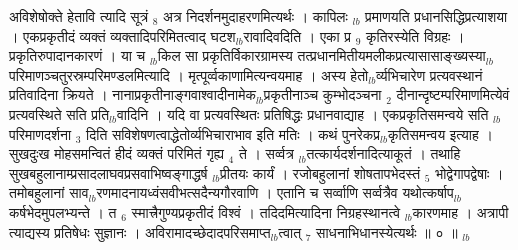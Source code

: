 \documentclass[article,12pt,a4paper]{memoir}%
\newcounter{parCount}
\begin{document}
	  
	  \pstart \leavevmode%
	\hphantom{.}{\color{DodgerBlue3}अविशेषोक्ते हेतावि} त्यादि सूत्रं {\tiny $_{8}$} अत्र निदर्शनमुदाहरणमित्यर्थः । {\color{DodgerBlue3}कापिलः} {\tiny $_{lb}$} प्रमाणयति प्रधानसिद्धिप्रत्याशया । एकप्रकृतीदं व्यक्तं व्यक्तादिपरिमितत्वाद् घटश{\tiny $_{lb}$}रावादिवदिति । एका प्र {\tiny $_{9}$} \leavevmode{} कृतिरस्येति विग्रहः । प्रकृतिरुपादानकारणं । या च {\tiny $_{lb}$}किल सा प्रकृतिर्विकारग्रामस्य तत्प्रधानमितीयमलीकप्रत्यासासाङ्ख्यस्या{\tiny $_{lb}$}\leavevmode{} परिमाणञ्चतुरस्रम्परिमण्डलमित्यादि । मृत्पूर्व्वकाणामित्यन्वयमाह । अस्य हेतो{\tiny $_{lb}$}र्व्यभिचारेण प्रत्यवस्थानं प्रतिवादिना क्रियते । नानाप्रकृतीनाङ्गवाश्वादीनामेक{\tiny $_{lb}$}प्रकृतीनाञ्च कुम्भोदञ्चना {\tiny $_{2}$} दीनान्दृष्टम्परिमाणमित्येवं प्रत्यवस्थिते सति प्रति{\tiny $_{lb}$}वादिनि । यदि वा प्रत्यवस्थितः प्रतिषिद्धः प्रधानवाद्याह । एकप्रकृतिसमन्वये सति {\tiny $_{lb}$}परिमाणदर्शना {\tiny $_{3}$} दिति सविशेषणत्वाद्धेतोर्व्यभिचाराभाव इति मतिः । कथं पुनरेकप्र{\tiny $_{lb}$}कृतिसमन्वय इत्याह । सुखदुःख {\color{DodgerBlue3}मोहसमन्वितं} हीदं व्यक्तं परिमितं गृह्य {\tiny $_{4}$} ते । सर्व्वत्र {\tiny $_{lb}$}तत्कार्यदर्शनादित्याकूतं । तथाहि सुखबहुलानाम्प्रसादलाघवप्रसवाभिष्वङ्गाद्धर्ष {\tiny $_{lb}$}प्रीतयः कार्यं । रजोबहुलानां शोषतापभेदस्तं {\tiny $_{5}$} भोद्वेगापद्वेषाः । तमोबहुलानां साव{\tiny $_{lb}$}रणमादनायध्वंसवीभत्सदैन्यगौरवाणि । एतानि च सर्व्वाणि सर्व्वत्रैव यथोत्कर्षाप{\tiny $_{lb}$}कर्षभेदमुपलभ्यन्ते । त {\tiny $_{6}$} स्मात्त्रैगुण्यप्रकृतीदं विश्वं । तदिदमित्यादिना निग्रहस्थानत्वे {\tiny $_{lb}$}कारणमाह । {\color{DodgerBlue3}अत्रापी} त्याद्यस्य प्रतिषेधः सुज्ञानः । अविरामादच्छेदादपरिसमाप्त{\tiny $_{lb}$}त्वात् {\tiny $_{7}$} साधनाभिधानस्येत्यर्थः ॥ ० ॥
	{}
	\pend%
      {\tiny $_{lb}$}
\end{document}
